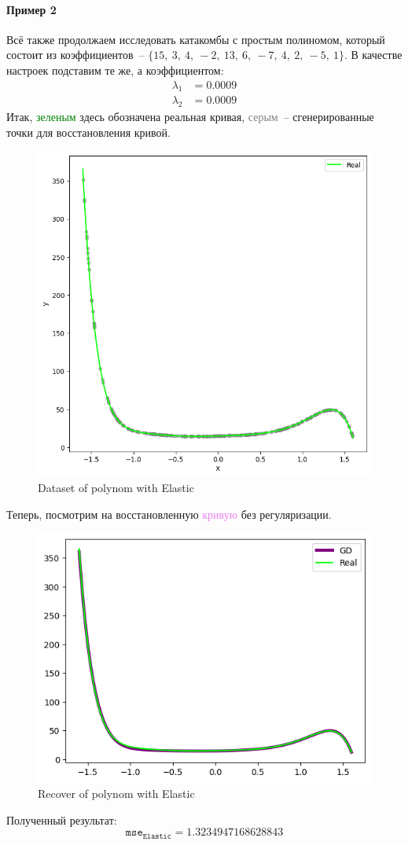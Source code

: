 \documentclass[12pt, a4paper, oneside, final]{article}
\begin{document}
	\paragraph{Пример 2}
	Всё также продолжаем исследовать катакомбы с простым полиномом, который состоит из коэффициентов~-- $\{15,~3,~4,~-2,~13,~6,~-7,~4,~2,~-5,~1\}$.
	В качестве настроек подставим те же, а коэффициентом:
	\begin{align*}
		\lambda_{1} &= 0.0009 \\
		\lambda_{2} &= 0.0009
	\end{align*}
	Итак, \textcolor{green}{зеленым} здесь обозначена реальная кривая, \textcolor{gray}{серым}~-- сгенерированные точки для восстановления кривой.
	\begin{figure}[H]
		\centering
		\includegraphics[scale = 0.8]{Image/AT2_ELASTIC_V2_DATA.png}
		\caption*{Dataset of polynom with Elastic}
	\end{figure}
	Теперь, посмотрим на восстановленную \textcolor{violet}{кривую} без регуляризации.
	\begin{figure}[H]
		\centering
		\includegraphics[scale = 1]{Image/AT2_ELASTIC_V2_RECOVER.png}
		\caption*{Recover of polynom with Elastic}
	\end{figure}
	Полученный результат:
	\[
		\mathtt{mse}_{\mathtt{Elastic}} = 1.3234947168628843
	\]
\end{document}
